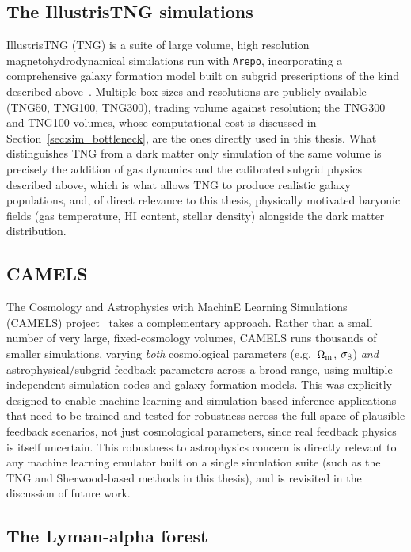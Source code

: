 \subsection{The IllustrisTNG simulations}

IllustrisTNG (TNG) is a suite of large volume, high resolution magnetohydrodynamical simulations run with \texttt{Arepo}, incorporating a comprehensive galaxy formation model built on subgrid prescriptions of the kind described above~\citep{nelson2021illustristngsimulationspublicdata,Pillepich_2017}. Multiple box sizes and resolutions are publicly available (TNG50, TNG100, TNG300), trading volume against resolution; the TNG300 and TNG100 volumes, whose computational cost is discussed in Section~\ref{sec:sim_bottleneck}, are the ones directly used in this thesis. What distinguishes TNG from a dark matter only simulation of the same volume is precisely the addition of gas dynamics and the calibrated subgrid physics described above, which is what allows TNG to produce realistic galaxy populations, and, of direct relevance to this thesis, physically motivated baryonic fields (gas temperature, HI content, stellar density) alongside the dark matter distribution.

\subsection{CAMELS}

The Cosmology and Astrophysics with MachinE Learning Simulations (CAMELS) project~\citep{villaescusa-navarro_camels_2021} takes a complementary approach. Rather than a small number of very large, fixed-cosmology volumes, CAMELS runs thousands of smaller simulations, varying \emph{both} cosmological parameters (e.g.\ $\Omega_\mathrm{m}$, $\sigma_8$) \emph{and} astrophysical/subgrid feedback parameters across a broad range, using multiple independent simulation codes and galaxy-formation models. This was explicitly designed to enable machine learning and simulation based inference applications that need to be trained and tested for robustness across the full space of plausible feedback scenarios, not just cosmological parameters, since real feedback physics is itself uncertain. This robustness to astrophysics concern is directly relevant to any machine learning emulator built on a single simulation suite (such as the TNG and Sherwood-based methods in this thesis), and is revisited in the discussion of future work.

\subsection{The Lyman-alpha forest}

